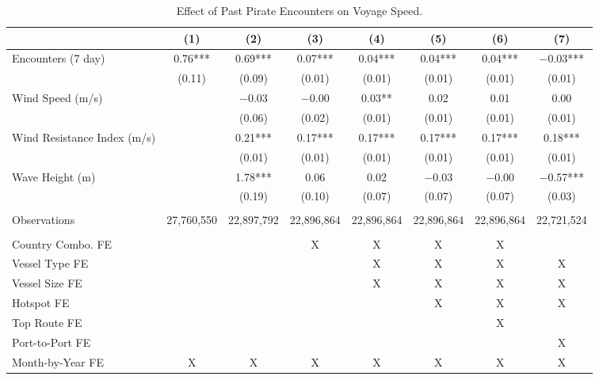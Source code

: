 \begin{table}
\centering
\caption{Effect of Past Pirate Encounters on Voyage Speed. \label{tab:spec-speed-table}}
\centering
\begin{adjustbox}{width = .9\textwidth}
\begin{threeparttable}
\begin{tabular}[t]{lccccccc}
\toprule
  & (1) & (2) & (3) & (4) & (5) & (6) & (7)\\
\midrule
Encounters (7 day) & \num{0.76}*** & \num{0.69}*** & \num{0.07}*** & \num{0.04}*** & \num{0.04}*** & \num{0.04}*** & \num{-0.03}***\\
 & (\num{0.11}) & (\num{0.09}) & (\num{0.01}) & (\num{0.01}) & (\num{0.01}) & (\num{0.01}) & (\num{0.01})\\
Wind Speed (m/s) &  & \num{-0.03} & \num{-0.00} & \num{0.03}** & \num{0.02} & \num{0.01} & \num{0.00}\\
 &  & (\num{0.06}) & (\num{0.02}) & (\num{0.01}) & (\num{0.01}) & (\num{0.01}) & (\num{0.01})\\
Wind Resistance Index (m/s) &  & \num{0.21}*** & \num{0.17}*** & \num{0.17}*** & \num{0.17}*** & \num{0.17}*** & \num{0.18}***\\
 &  & (\num{0.01}) & (\num{0.01}) & (\num{0.01}) & (\num{0.01}) & (\num{0.01}) & (\num{0.01})\\
Wave Height (m) &  & \num{1.78}*** & \num{0.06} & \num{0.02} & \num{-0.03} & \num{-0.00} & \num{-0.57}***\\
 &  & (\num{0.19}) & (\num{0.10}) & (\num{0.07}) & (\num{0.07}) & (\num{0.07}) & (\num{0.03})\\
 &  &  &  &  &  &  & \\
Observations & 27,760,550 & 22,897,792 & 22,896,864 & 22,896,864 & 22,896,864 & 22,896,864 & 22,721,524\\
 &  &  &  &  &  &  & \\
Country Combo. FE &  &  & X & X & X & X & \\
Vessel Type FE &  &  &  & X & X & X & X\\
Vessel Size FE &  &  &  & X & X & X & X\\
Hotspot FE &  &  &  &  & X & X & X\\
Top Route FE &  &  &  &  &  & X & \\
Port-to-Port FE &  &  &  &  &  &  & X\\
Month-by-Year FE & X & X & X & X & X & X & X\\
\bottomrule
\end{tabular}
\begin{tablenotes}

\end{tablenotes}
\end{threeparttable}
\end{adjustbox}
\end{table}
